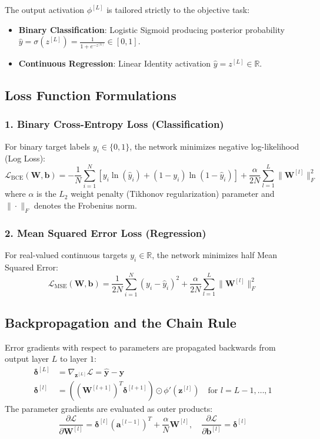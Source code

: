 \documentclass[12pt]{article}
\begin{document}
The output activation $\phi^{[L]}$ is tailored strictly to the objective task:
\begin{itemize}
    \item \textbf{Binary Classification}: Logistic Sigmoid producing posterior probability $\hat{y} = \sigma(z^{[L]}) = \frac{1}{1 + e^{-z^{[L]}}} \in [0, 1]$.
    \item \textbf{Continuous Regression}: Linear Identity activation $\hat{y} = z^{[L]} \in \mathbb{R}$.
\end{itemize}

\subsection{Loss Function Formulations}
\subsubsection{1. Binary Cross-Entropy Loss (Classification)}
For binary target labels $y_i \in \{0, 1\}$, the network minimizes negative log-likelihood (Log Loss):
\begin{equation}
    \mathcal{L}_{\text{BCE}}(\mathbf{W}, \mathbf{b}) = -\frac{1}{N} \sum_{i=1}^{N} \left[ y_i \ln(\hat{y}_i) + (1 - y_i) \ln(1 - \hat{y}_i) \right] + \frac{\alpha}{2N} \sum_{l=1}^{L} \|\mathbf{W}^{[l]}\|_F^2
\end{equation}
where $\alpha$ is the $L_2$ weight penalty (Tikhonov regularization) parameter and $\|\cdot\|_F$ denotes the Frobenius norm.

\subsubsection{2. Mean Squared Error Loss (Regression)}
For real-valued continuous targets $y_i \in \mathbb{R}$, the network minimizes half Mean Squared Error:
\begin{equation}
    \mathcal{L}_{\text{MSE}}(\mathbf{W}, \mathbf{b}) = \frac{1}{2N} \sum_{i=1}^{N} (y_i - \hat{y}_i)^2 + \frac{\alpha}{2N} \sum_{l=1}^{L} \|\mathbf{W}^{[l]}\|_F^2
\end{equation}

\subsection{Backpropagation and the Chain Rule}
Error gradients with respect to parameters are propagated backwards from output layer $L$ to layer $1$:
\begin{align}
    \boldsymbol{\delta}^{[L]} &= \nabla_{\mathbf{z}^{[L]}} \mathcal{L} = \hat{\mathbf{y}} - \mathbf{y} \\
    \boldsymbol{\delta}^{[l]} &= \left( (\mathbf{W}^{[l+1]})^T \boldsymbol{\delta}^{[l+1]} \right) \odot \phi'(\mathbf{z}^{[l]}) \quad \text{for } l = L-1, \dots, 1
\end{align}
The parameter gradients are evaluated as outer products:
\begin{equation}
    \frac{\partial \mathcal{L}}{\partial \mathbf{W}^{[l]}} = \boldsymbol{\delta}^{[l]} (\mathbf{a}^{[l-1]})^T + \frac{\alpha}{N} \mathbf{W}^{[l]}, \quad \frac{\partial \mathcal{L}}{\partial \mathbf{b}^{[l]}} = \boldsymbol{\delta}^{[l]}
\end{equation}
\end{document}
